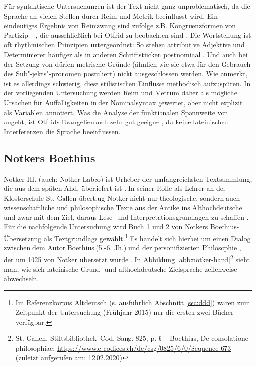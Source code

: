 Für syntaktische Untersuchungen ist der Text nicht ganz unproblematisch, da die Sprache an vielen Stellen durch Reim und Metrik beeinflusst wird. Ein eindeutiges Ergebnis von  Reimzwang sind \textcite[35f.]{Fleischer2006} zufolge z.B. Kongruenzformen von Partizip\,+\,, die ausschließlich bei Otfrid zu beobachten sind \parencites()()[s. auch][52]{Fleischer2011}[]{Gillmann2016}. 
Die Wortstellung ist oft rhythmischen Prinzipien untergeordnet: So stehen attributive Adjektive und Determinierer häufiger als in anderen Schriftstücken postnominal \parencites()()[282f.]{Oubouzar1989}[29]{Schrodt2004}. Und auch bei der Setzung von  dürfen metrische Gründe (ähnlich wie  \textcite{Eggenberger1961} sie etwa für den Gebrauch des Sub"-jekts"-pronomen postuliert) nicht ausgeschlossen werden. Wie \textcite[37]{Fleischer2006} anmerkt, ist es allerdings schwierig, diese stilistischen Einflüsse methodisch aufzuspüren. In der vorliegenden Untersuchung werden Reim und Metrum daher als mögliche Ursachen für Auffälligkeiten in der Nominalsyntax gewertet, aber nicht explizit als Variablen annotiert. Was die Analyse der funktionalen Spannweite von  angeht, ist Otfrids Evangelienbuch sehr gut geeignet, da keine lateinischen Interferenzen die Sprache beeinflussen. 

\subsection{Notkers Boethius} \label{sec:notker}

Notker III. (auch: Notker Labeo) ist Urheber der umfangreichsten Textsammlung, die aus dem späten Ahd. überliefert ist \parencites[157]{Meineke2001}. In seiner Rolle als Lehrer an der Klosterschule St. Gallen übertrug Notker nicht nur theologische, sondern auch wissenschaftliche und philosophische Texte aus der Antike ins Althochdeutsche und zwar mit dem Ziel, daraus Lese- und Interpretationsgrundlagen zu schaffen \parencite[zur Übersicht s.][136]{Sonderegger2003}. Für die nachfolgende Untersuchung wird Buch 1 und 2 von Notkers Boethius-Übersetzung  als Textgrundlage gewählt.\footnote{Im Referenzkorpus Altdeutsch (s. ausführlich Abschnitt \ref{sec:ddd}) waren zum Zeitpunkt der Untersuchung (Frühjahr 2015) nur die ersten zwei Bücher verfügbar.} Es handelt sich hierbei um einen Dialog zwischen dem Autor Boethius (5.-6. Jh.) und der personifizierten Philosophie \parencite[vgl.][]{Gruber2006}, der um 1025 von Notker übersetzt wurde \parencite[138]{Sonderegger2003}. 
In Abbildung \ref{abb:notker-hand}\footnote{St. Gallen, Stiftsbibliothek, Cod. Sang. 825, p. 6 – Boethius, De consolatione philosophiae; \url{https://www.e-codices.ch/de/csg/0825/6/0/Sequence-673} (zuletzt aufgerufen am: 12.02.2020)} sieht man, wie sich lateinische Grund- und althochdeutsche Zielsprache zeilenweise abwechseln.   

